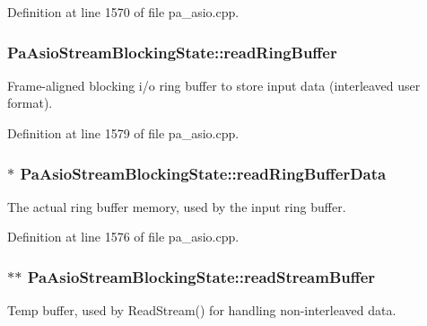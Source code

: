 Definition at line 1570 of file pa\+\_\+asio.\+cpp.

\subsubsection[{\texorpdfstring{read\+Ring\+Buffer}{readRingBuffer}}]{ Pa\+Asio\+Stream\+Blocking\+State\+::read\+Ring\+Buffer}\hypertarget{struct_pa_asio_stream_blocking_state_a5ae8106505c2ad1fd79f03274071ad1b}{}\label{struct_pa_asio_stream_blocking_state_a5ae8106505c2ad1fd79f03274071ad1b}
Frame-\/aligned blocking i/o ring buffer to store input data (interleaved user format). 

Definition at line 1579 of file pa\+\_\+asio.\+cpp.

\subsubsection[{\texorpdfstring{read\+Ring\+Buffer\+Data}{readRingBufferData}}]{$\ast$ Pa\+Asio\+Stream\+Blocking\+State\+::read\+Ring\+Buffer\+Data}\hypertarget{struct_pa_asio_stream_blocking_state_a45031877aa21279da777339eee2b1156}{}\label{struct_pa_asio_stream_blocking_state_a45031877aa21279da777339eee2b1156}
The actual ring buffer memory, used by the input ring buffer. 

Definition at line 1576 of file pa\+\_\+asio.\+cpp.

\subsubsection[{\texorpdfstring{read\+Stream\+Buffer}{readStreamBuffer}}]{$\ast$$\ast$ Pa\+Asio\+Stream\+Blocking\+State\+::read\+Stream\+Buffer}\hypertarget{struct_pa_asio_stream_blocking_state_a6c1cd19d9bee99ff976b75877cfb566f}{}\label{struct_pa_asio_stream_blocking_state_a6c1cd19d9bee99ff976b75877cfb566f}
Temp buffer, used by Read\+Stream() for handling non-\/interleaved data. 

